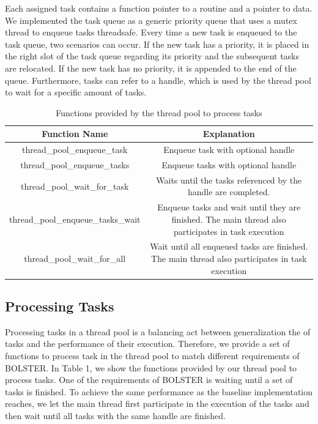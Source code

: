 \documentclass[conference]{IEEEtran}
\begin{document}
Each assigned task contains a function pointer to a routine and a pointer to data. We implemented the task queue as a generic priority queue that uses a mutex thread to enqueue tasks threadsafe. Every time a new task is enqueued to the task queue, two scenarios can occur. If the new task has a priority, it is placed in the right slot of the task queue regarding its priority and the subsequent tasks are relocated. If the  new task has no priority, it is appended to the end of the queue. Furthermore, tasks can refer to a handle, which is used by the thread pool to wait for a specific amount of tasks.
\begin{table}[htbp]
	\caption{Functions provided by the thread pool to process tasks}
	\begin{center}
		\begin{tabular}{ c c }
			\hline
			\textbf{Function Name}&\textbf{Explanation}\\
			\hline
			thread\_pool\_enqueue\_task & Enqueue task with optional handle \\
			thread\_pool\_enqueue\_tasks & Enqueue tasks with optional handle \\
			thread\_pool\_wait\_for\_task & Waits until the tasks referenced by the handle are completed. \\
			thread\_pool\_enqueue\_tasks\_wait & Enqueue tasks and wait until they are finished. The main thread also participates in task execution\\ 
			thread\_pool\_wait\_for\_all & Wait until all enqueued tasks are finished. The main thread also participates in task execution \\ \hline
		\end{tabular}
		\label{tab1}
	\end{center}
\end{table}
\subsection{Processing Tasks}
Processing tasks in a thread pool is a balancing act between generalization the of tasks and the performance of their execution. Therefore, we provide a set of functions to process task in the thread pool to match different requirements of BOLSTER. In Table 1, we show the functions provided by our thread pool to process tasks. One of the requirements of BOLSTER is waiting until a set of tasks is finished. To achieve the same performance as the baseline implementation reaches, we let the main thread first participate in the execution of the tasks and then wait until all tasks with the same handle are finished. 
\end{document}
